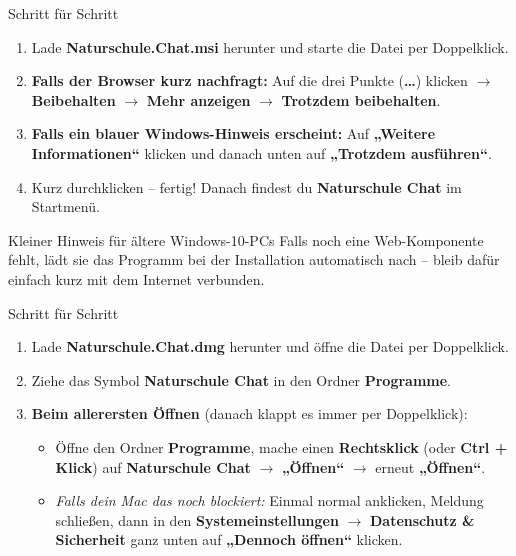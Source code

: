 \documentclass{lernblatt}
\begin{document}
\fancyhead[R]{\scriptsize\textcolor{slate}{Naturschule}}


\begin{aufg}{Schritt für Schritt}
\begin{enumerate}
  \item Lade \textbf{Naturschule.Chat.msi} herunter und starte die Datei per Doppelklick.
  \item \textbf{Falls der Browser kurz nachfragt:} Auf die drei Punkte (\textbf{\dots}) klicken $\rightarrow$ \textbf{Beibehalten} $\rightarrow$ \textbf{Mehr anzeigen} $\rightarrow$ \textbf{Trotzdem beibehalten}.
  \item \textbf{Falls ein blauer Windows-Hinweis erscheint:} Auf \textbf{„Weitere Informationen“} klicken und danach unten auf \textbf{„Trotzdem ausführen“}.
  \item Kurz durchklicken -- fertig! Danach findest du \textbf{Naturschule Chat} im Startmenü.
\end{enumerate}
\end{aufg}

\begin{tipp}{Kleiner Hinweis für ältere Windows-10-PCs}
Falls noch eine Web-Komponente fehlt, lädt sie das Programm bei der Installation automatisch nach -- bleib dafür einfach kurz mit dem Internet verbunden.
\end{tipp}


\begin{aufg}{Schritt für Schritt}
\begin{enumerate}
  \item Lade \textbf{Naturschule.Chat.dmg} herunter und öffne die Datei per Doppelklick.
  \item Ziehe das Symbol \textbf{Naturschule Chat} in den Ordner \textbf{Programme}.
  \item \textbf{Beim allerersten Öffnen} (danach klappt es immer per Doppelklick):
    \begin{itemize}
      \item Öffne den Ordner \textbf{Programme}, mache einen \textbf{Rechtsklick} (oder \textbf{Ctrl + Klick}) auf \textbf{Naturschule Chat} $\rightarrow$ \textbf{„Öffnen“} $\rightarrow$ erneut \textbf{„Öffnen“}.
      \item \emph{Falls dein Mac das noch blockiert:} Einmal normal anklicken, Meldung schließen, dann in den \textbf{Systemeinstellungen} $\rightarrow$ \textbf{Datenschutz \& Sicherheit} ganz unten auf \textbf{„Dennoch öffnen“} klicken.
    \end{itemize}
\end{enumerate}
\end{aufg}
\end{document}
